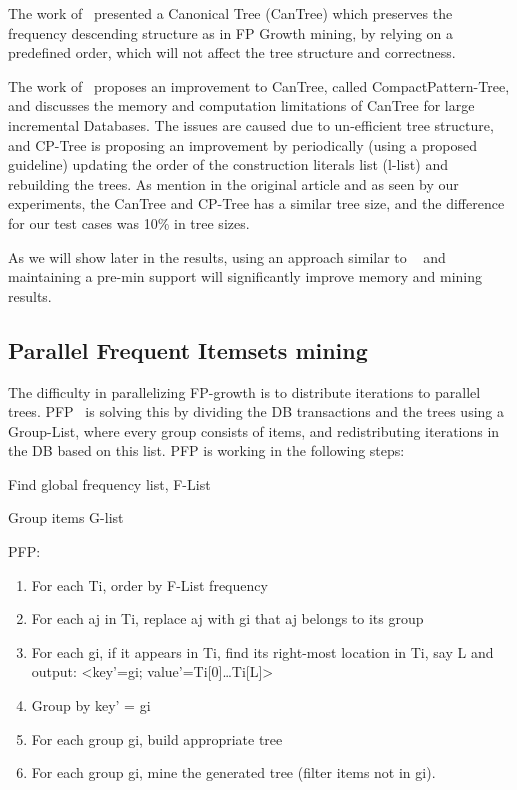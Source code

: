 \documentclass[sigconf, nonacm]{acmart}
\begin{document}
The work of~\cite{leung2005cantree} presented a Canonical Tree (CanTree) which preserves the frequency descending structure as in FP Growth mining, by relying on a predefined order, which will not affect the tree structure and correctness.

	The work of~\cite{tanbeer2009efficient} proposes an improvement to CanTree, called CompactPattern-Tree, and discusses the memory and computation limitations of CanTree for large incremental Databases. The issues are caused due to un-efficient tree structure, and CP-Tree is proposing an improvement by periodically (using a proposed guideline) updating the order of the construction literals list (l-list) and rebuilding the trees. As mention in the original article and as seen by our experiments, the CanTree and CP-Tree has a similar tree size, and the difference for our test cases was 10\% in tree sizes. 
	
	As we will show later in the results, using an approach similar to ~\cite{kohefficient} and maintaining a pre-min support will significantly improve memory and mining results.
	

\subsection{Parallel Frequent Itemsets mining}
The difficulty in parallelizing FP-growth is to distribute iterations to parallel trees. PFP~\cite{li2008pfp} is solving this by dividing the DB transactions and the trees using a Group-List, where every group consists of items, and redistributing iterations in the DB based on this list.
PFP is working in the following steps:

\begin{steps}
	\item Find global frequency list, F-List
	\item Group items G-list
	\item PFP:
		\begin{enumerate}
			\item For each Ti, order by F-List frequency
			\item For each aj in Ti, replace aj with gi that aj belongs to its group
			\item For each gi, if it appears in Ti, find its right-most location in Ti, say L and output:
 <key'=gi; value'={Ti[0]…Ti[L]}>
 			\item Group by key' = gi
 			\item For each group gi, build appropriate tree
 			\item For each group gi, mine the generated tree (filter items not in gi).
		\end{enumerate}
\end{steps}
\end{document}
